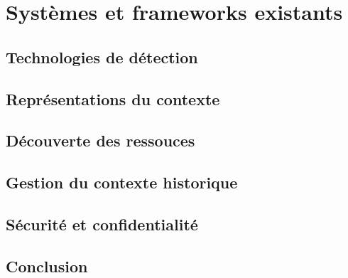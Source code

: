\section{Systèmes et frameworks existants}



\subsection{Technologies de détection}

\subsection{Représentations du contexte}

\subsection{Découverte des ressouces}

\subsection{Gestion du contexte historique}

\subsection{Sécurité et confidentialité}

\subsection{Conclusion}


